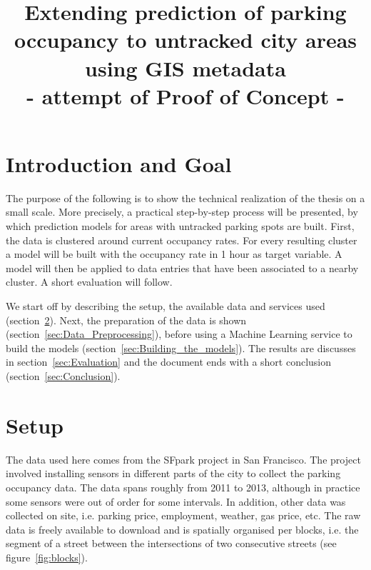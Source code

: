 \documentclass{article}
\begin{document}
\title{Extending prediction of parking occupancy to untracked city areas using GIS metadata \\ - attempt of Proof of Concept -}

\maketitle

\section{Introduction and Goal}
The purpose of the following is to show the technical realization of the thesis on a small scale. More precisely, a practical step-by-step process will be presented, by which prediction models for areas with untracked parking spots are built. First, the data is clustered around current occupancy rates. For every resulting cluster a model will be built with the occupancy rate in 1 hour as target variable. A model will then be applied to data entries that have been associated to a nearby cluster. A short evaluation will follow.
\vspace{2mm}

We start off by describing the setup, the available data and services used (section~\ref{sec:Setup}). Next, the preparation of the data is shown (section~\ref{sec:Data_Preprocessing}), before using a Machine Learning service to build the models (section~\ref{sec:Building_the_models}). The results are discusses in section~\ref{sec:Evaluation} and the document ends with a short conclusion (section~\ref{sec:Conclusion}).

\section{Setup}
\label{sec:Setup}
The data used here comes from the SFpark project in San Francisco\cite{sfpark}. The project involved installing sensors in different parts of the city to collect the parking occupancy data. The data spans roughly from 2011 to 2013, although in practice some sensors were out of order for some intervals. In addition, other data was collected on site, i.e. parking price, employment, weather, gas price, etc. The raw data is freely available to download and is spatially organised per blocks, i.e. the segment of a street between the intersections of two consecutive streets (see figure~\ref{fig:blocks}). 
\vspace{2mm}
\end{document}
